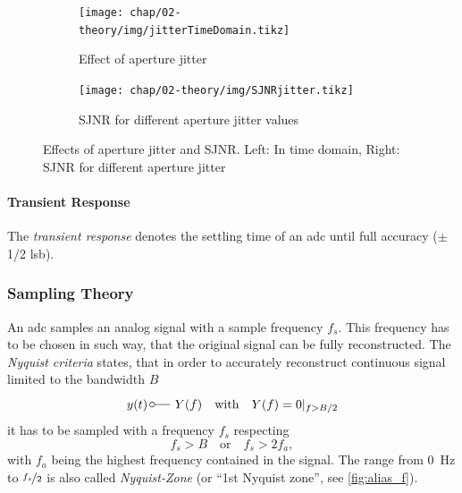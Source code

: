 \begin{figure}[tbh]
	\centering
	\begin{subfigure}{0.4\textwidth}
		\centering
		\texttt{[image: chap/02-theory/img/jitterTimeDomain.tikz]}  
		\caption{Effect of aperture jitter}
		\label{fig:jitter}
	\end{subfigure}
	\hfill
	\begin{subfigure}{0.4\textwidth}
		\centering
		\texttt{[image: chap/02-theory/img/SJNRjitter.tikz]}  
		\caption{SJNR for different aperture jitter values}
		\label{fig:sjnr}
	\end{subfigure}
	\caption[Aperture jitter and SJNR]{Effects of aperture jitter and SJNR. Left: In time domain, Right: SJNR for different aperture jitter \cite{Lundberg}}
	\label{fig:ap_jit}
\end{figure}

\paragraph{Transient Response}
The \textit{transient response} denotes the settling time of an \gls{adc} until full accuracy ($\pm$ 1/2 \gls{lsb}).


\subsubsection{Sampling Theory}
An \gls{adc} samples an analog signal with a sample frequency $f_s$.
This frequency has to be chosen in such way, that the original signal can be fully reconstructed.
The \textit{Nyquist criteria} states, that in order to accurately reconstruct continuous signal limited to the bandwidth $B$
\begin{equation}
	y (t) \, \fourier  Y(f) \quad \text{with} \quad Y(f)=0\vert_{f>B/2}
\end{equation} %
it has to be sampled with a frequency $f_s$ respecting
\begin{equation} \label{eq:nyquist}
	f_s > B \quad \text{or} \quad f_s > 2 f_a,
\end{equation}
with $f_a$ being the highest frequency contained in the signal. \cite{walt,puente2015}
The range from \SI{0}{\Hz} to $\nicefrac{f_s}{2}$ is also called \textit{Nyquist-Zone} (or ``1st Nyquist zone'', see \autoref{fig:alias_f}).

